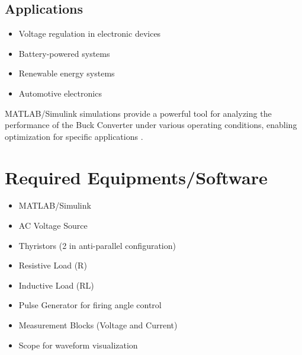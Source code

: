 \documentclass[12pt]{article}
\begin{document}
\subsection*{Applications}
\begin{itemize}
    \item Voltage regulation in electronic devices
    \item Battery-powered systems
    \item Renewable energy systems
    \item Automotive electronics
\end{itemize}

MATLAB/Simulink simulations provide a powerful tool for analyzing the performance of the Buck Converter under various operating conditions, enabling optimization for specific applications \cite{mathworks2023simulink}.


\section*{Required Equipments/Software}
\begin{itemize}
    \item MATLAB/Simulink
    \item AC Voltage Source
    \item Thyristors (2 in anti-parallel configuration)
    \item Resistive Load (R)
    \item Inductive Load (RL)
    \item Pulse Generator for firing angle control
    \item Measurement Blocks (Voltage and Current)
    \item Scope for waveform visualization
\end{itemize}
\end{document}
